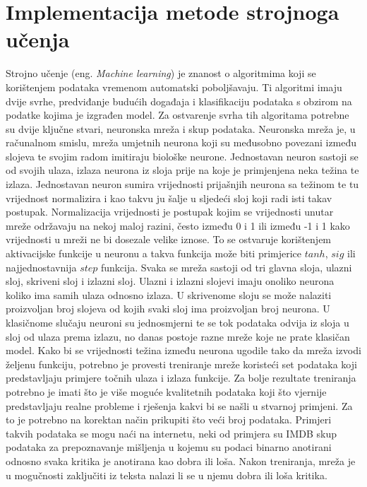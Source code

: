 \documentclass[times, utf8, diplomski]{fer}
\begin{document}
\chapter{Implementacija metode strojnoga učenja}
Strojno učenje (eng. \textit{Machine learning}) je znanost o algoritmima koji se korištenjem podataka vremenom
automatski poboljšavaju. Ti algoritmi imaju dvije svrhe, predviđanje budućih događaja i klasifikaciju podataka
s obzirom na podatke kojima je izgrađen model. Za ostvarenje svrha tih algoritama potrebne su dvije ključne
stvari, neuronska mreža i skup podataka. Neuronska mreža je, u računalnom smislu, mreža umjetnih neurona koji su
međusobno povezani između slojeva te svojim radom imitiraju biološke neurone. Jednostavan neuron sastoji se
od svojih ulaza, izlaza neurona iz sloja prije na koje je primjenjena neka težina te izlaza. Jednostavan
neuron sumira vrijednosti prijašnjih neurona sa težinom te tu vrijednost normalizira i kao takvu ju šalje
u sljedeći sloj koji radi isti takav postupak. Normalizacija vrijednosti je postupak kojim se vrijednosti
unutar mreže održavaju na nekoj maloj razini, često između 0 i 1 ili između -1 i 1 kako vrijednosti u mreži
ne bi dosezale velike iznose. To se ostvaruje korištenjem aktivacijske funkcije u neuronu a takva funkcija može
biti primjerice $tanh$, $sig$ ili najjednostavnija $step$ funkcija. Svaka se mreža sastoji od tri glavna sloja,
ulazni sloj, skriveni sloj i izlazni sloj. Ulazni i izlazni slojevi imaju onoliko neurona koliko ima samih
ulaza odnosno izlaza. U skrivenome sloju se može nalaziti proizvoljan broj slojeva od kojih svaki sloj ima
proizvoljan broj neurona. U klasičnome slučaju neuroni su jednosmjerni te se tok podataka odvija iz sloja u
sloj od ulaza prema izlazu, no danas postoje razne mreže koje ne prate klasičan model. Kako bi se vrijednosti
težina između neurona ugodile tako da mreža izvodi željenu funkciju, potrebno je provesti treniranje mreže
koristeći set podataka koji predstavljaju primjere točnih ulaza i izlaza funkcije. Za bolje rezultate treniranja
potrebno je imati što je više moguće kvalitetnih podataka koji što vjernije predstavljaju realne probleme i
rješenja kakvi bi se našli u stvarnoj primjeni. Za to je potrebno na korektan način prikupiti što veći broj
podataka. Primjeri takvih podataka se mogu naći na internetu, neki od primjera su IMDB skup podataka za 
prepoznavanje mišljenja u kojemu su podaci binarno anotirani odnosno svaka kritika je anotirana kao dobra ili
loša. Nakon treniranja, mreža je u mogučnosti zaključiti iz teksta nalazi li se u njemu dobra ili loša kritika.
\end{document}
